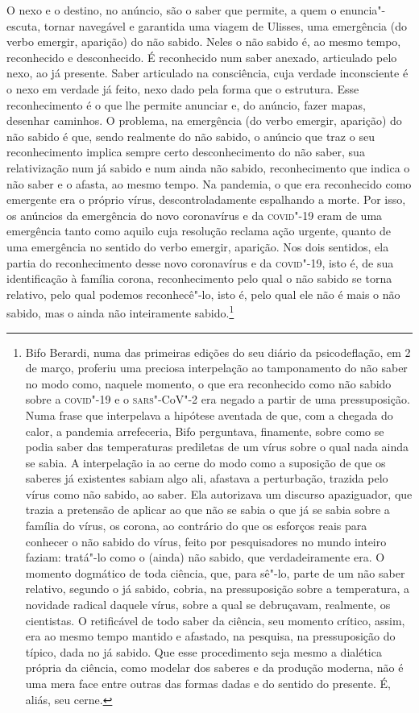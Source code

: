 O nexo e o destino, no anúncio, são o saber que permite, a quem o
enuncia"-escuta, tornar navegável e garantida uma viagem de Ulisses, uma
emergência (do verbo emergir, aparição) do não sabido. Neles o não
sabido é, ao mesmo tempo, reconhecido e desconhecido. É reconhecido num
saber anexado, articulado pelo nexo, ao já presente. Saber articulado na
consciência, cuja verdade inconsciente é o nexo em verdade já feito,
nexo dado pela forma que o estrutura. Esse reconhecimento é o que lhe
permite anunciar e, do anúncio, fazer mapas, desenhar caminhos. O
problema, na emergência (do verbo emergir, aparição) do não sabido é
que, sendo realmente do não sabido, o anúncio que traz o seu
reconhecimento implica sempre certo desconhecimento do não saber, sua
relativização num já sabido e num ainda não sabido, reconhecimento que
indica o não saber e o afasta, ao mesmo tempo. Na pandemia, o que era
reconhecido como emergente era o próprio vírus, descontroladamente
espalhando a morte. Por isso, os anúncios da emergência do novo
coronavírus e da \textsc{covid}"-19 eram de uma emergência tanto como aquilo cuja
resolução reclama ação urgente, quanto de uma emergência no sentido do
verbo emergir, aparição. Nos dois sentidos, ela partia do reconhecimento
desse novo coronavírus e da \textsc{covid}"-19, isto é, de sua identificação à
família corona, reconhecimento pelo qual o não sabido se torna relativo,
pelo qual podemos reconhecê"-lo, isto é, pelo qual ele não é mais o não
sabido, mas o ainda não inteiramente sabido.\footnote{Bifo Berardi, numa
  das primeiras edições do seu diário da psicodeflação, em 2 de março,
  proferiu uma preciosa interpelação ao tamponamento do não saber no
  modo como, naquele momento, o que era reconhecido como não sabido
  sobre a \textsc{covid}"-19 e o \textsc{sars}"-CoV"-2 era negado a partir de uma
  pressuposição. Numa frase que interpelava a hipótese aventada de que,
  com a chegada do calor, a pandemia arrefeceria, Bifo perguntava,
  finamente, sobre como se podia saber das temperaturas prediletas de um
  vírus sobre o qual nada ainda se sabia. A interpelação ia ao cerne do
  modo como a suposição de que os saberes já existentes sabiam algo ali,
  afastava a perturbação, trazida pelo vírus como não sabido, ao saber.
  Ela autorizava um discurso apaziguador, que trazia a pretensão de
  aplicar ao que não se sabia o que já se sabia sobre a família do
  vírus, os corona, ao contrário do que os esforços reais para conhecer
  o não sabido do vírus, feito por pesquisadores no mundo inteiro
  faziam: tratá"-lo como o (ainda) não sabido, que verdadeiramente era. O
  momento dogmático de toda ciência, que, para sê"-lo, parte de um não
  saber relativo, segundo o já sabido, cobria, na pressuposição sobre a
  temperatura, a novidade radical daquele vírus, sobre a qual se
  debruçavam, realmente, os cientistas. O retificável de todo saber da
  ciência, seu momento crítico, assim, era ao mesmo tempo mantido e
  afastado, na pesquisa, na pressuposição do típico, dada no já sabido.
  Que esse procedimento seja mesmo a dialética própria da ciência, como
  modelar dos saberes e da produção moderna, não é uma mera face entre
  outras das formas dadas e do sentido do presente. É, aliás, seu cerne.}

